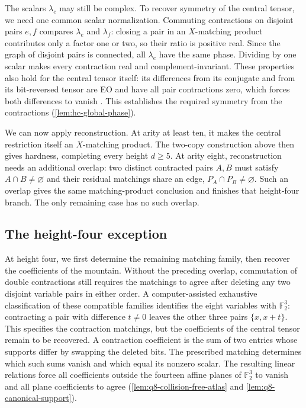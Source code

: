 \documentclass[11pt,letterpaper,onecolumn]{article}
\theoremstyle{plain}
\theoremstyle{definition}
\theoremstyle{remark}
\begin{document}
The scalars \(\lambda_e\) may still be complex. To recover symmetry of
the central tensor, we need one common scalar normalization. Commuting
contractions on disjoint pairs \(e,f\) compares \(\lambda_e\) and
\(\lambda_f\): closing a pair in an \(X\)-matching product contributes
only a factor one or two, so their ratio is positive real. Since the
graph of disjoint pairs is connected, all \(\lambda_e\) have the same
phase. Dividing by one scalar makes every contraction real and
complement-invariant. These properties also hold for the central tensor
itself: its differences from its conjugate and from its bit-reversed
tensor are EO and have all pair contractions zero, which forces both
differences to vanish \cite[Lemma~2.7]{CaiFuShao2020ARS}. This establishes
the required symmetry from the contractions (\cref{lem:hc-global-phase}).

We can now apply reconstruction. At arity at least ten, it makes the
central restriction itself an \(X\)-matching product. The two-copy
construction above then gives hardness, completing every height
\(d\ge5\). At arity eight, reconstruction needs an additional overlap:
two distinct contracted pairs \(A,B\) must satisfy
\(A\cap B\ne\varnothing\) and their residual matchings share an edge,
\(P_A\cap P_B\ne\varnothing\). Such an overlap gives the same
matching-product conclusion and finishes that height-four branch.
The only remaining case has no such overlap.

\subsection{The height-four exception}

At height four, we first determine the remaining matching family, then
recover the coefficients of the mountain. Without the preceding overlap,
commutation of double contractions still requires the matchings to agree
after deleting any two disjoint variable pairs in either order. A
computer-assisted exhaustive classification of these compatible families
identifies the eight variables with \(\mathbb F_2^3\): contracting a pair
with difference \(t\ne0\) leaves the other three pairs \(\{x,x+t\}\).
This specifies the contraction matchings, but the coefficients of the
central tensor remain to be recovered. A contraction coefficient is the
sum of two entries whose supports differ by swapping the deleted bits.
The prescribed matching determines which such sums vanish and which
equal its nonzero scalar. The resulting linear relations force all
coefficients outside the fourteen affine planes of \(\mathbb F_2^3\)
to vanish and all plane coefficients to agree (\cref{lem:q8-collision-free-atlas} and
\cref{lem:q8-canonical-support}).
\end{document}
